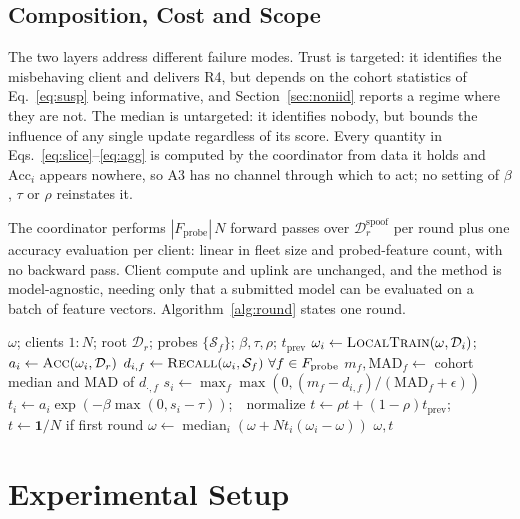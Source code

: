 \documentclass[conference]{IEEEtran}
\begin{document}
\subsection{Composition, Cost and Scope}

The two layers address different failure modes. Trust is targeted: it
identifies the misbehaving client and delivers R4, but depends on the cohort
statistics of Eq.~\eqref{eq:susp} being informative, and
Section~\ref{sec:noniid} reports a regime where they are not. The median is
untargeted: it identifies nobody, but bounds the influence of any single update
regardless of its score. Every quantity in
Eqs.~\eqref{eq:slice}--\eqref{eq:agg} is computed by the coordinator from data
it holds and $\mathrm{Acc}_i$ appears nowhere, so A3 has no channel through
which to act; no setting of $\beta$, $\tau$ or $\rho$ reinstates it.

The coordinator performs $|F_{\mathrm{probe}}|\,N$ forward passes over
$\mathcal{D}_r^{\mathrm{spoof}}$ per round plus one accuracy evaluation per
client: linear in fleet size and probed-feature count, with no backward pass.
Client compute and uplink are unchanged, and the method is model-agnostic,
needing only that a submitted model can be evaluated on a batch of feature
vectors. Algorithm~\ref{alg:round} states one round.

\begin{algorithm}[!t]
\caption{One round with behavioral probing}
\label{alg:round}
\begin{algorithmic}[1]
\Require $\omega$; clients $1{:}N$; root $\mathcal{D}_r$; probes $\{\mathcal{S}_f\}$; $\beta,\tau,\rho$; $t_{\mathrm{prev}}$
  \State $\omega_i \gets \textsc{LocalTrain}(\omega,\mathcal{D}_i)$;\ \ $a_i \gets \textsc{Acc}(\omega_i,\mathcal{D}_r)$
  \State $d_{i,f}\gets\textsc{Recall}(\omega_i,\mathcal{S}_f)\ \forall f\in F_{\mathrm{probe}}$
\EndFor
\State $m_f,\mathrm{MAD}_f \gets$ cohort median and MAD of $d_{\cdot,f}$
\State $s_i \gets \max_f \max(0,(m_f-d_{i,f})/(\mathrm{MAD}_f+\epsilon))$
\State $t_i \gets a_i\exp(-\beta\max(0,s_i-\tau))$;\ \ normalize
\State $t \gets \rho t+(1-\rho)t_{\mathrm{prev}}$;\ \ $t\gets\mathbf{1}/N$ if first round
\State $\omega \gets \operatorname{median}_i(\omega+N t_i(\omega_i-\omega))$
\State \Return $\omega, t$
\end{algorithmic}
\end{algorithm}

\section{Experimental Setup}
\label{sec:setup}
\end{document}
